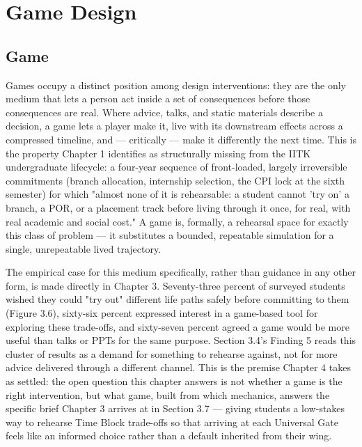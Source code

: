 \chapter{Game Design}\doublespacing
\label{Chapter4}



\section{Game}

Games occupy a distinct position among design interventions: they are the only medium that lets a person act inside a set of consequences before those consequences are real. Where advice, talks, and static materials describe a decision, a game lets a player make it, live with its downstream effects across a compressed timeline, and --- critically --- make it differently the next time. This is the property Chapter 1 identifies as structurally missing from the IITK undergraduate lifecycle: a four-year sequence of front-loaded, largely irreversible commitments (branch allocation, internship selection, the CPI lock at the sixth semester) for which "almost none of it is rehearsable: a student cannot 'try on' a branch, a POR, or a placement track before living through it once, for real, with real academic and social cost." A game is, formally, a rehearsal space for exactly this class of problem --- it substitutes a bounded, repeatable simulation for a single, unrepeatable lived trajectory.

The empirical case for this medium specifically, rather than guidance in any other form, is made directly in Chapter 3. Seventy-three percent of surveyed students wished they could "try out" different life paths safely before committing to them (Figure 3.6), sixty-six percent expressed interest in a game-based tool for exploring these trade-offs, and sixty-seven percent agreed a game would be more useful than talks or PPTs for the same purpose. Section 3.4's Finding 5 reads this cluster of results as a demand for something to rehearse against, not for more advice delivered through a different channel. This is the premise Chapter 4 takes as settled: the open question this chapter answers is not whether a game is the right intervention, but what game, built from which mechanics, answers the specific brief Chapter 3 arrives at in Section 3.7 --- giving students a low-stakes way to rehearse Time Block trade-offs so that arriving at each Universal Gate feels like an informed choice rather than a default inherited from their wing.

